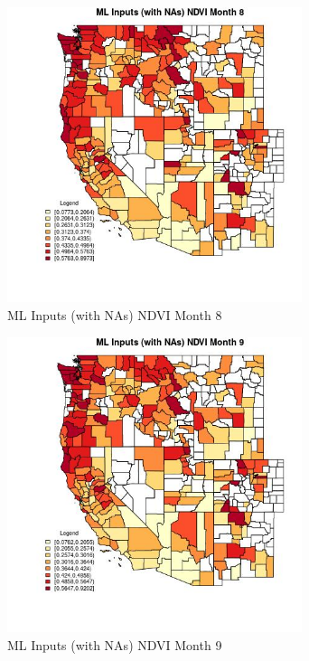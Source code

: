 \begin{figure} 
\centering  
\includegraphics[width=0.77\textwidth]{Code_Outputs/Report_ML_input_PM25_Step4_part_f_de_duplicated_aveswNAs_CountyNDVImedianMonth8.jpg} 
\caption{\label{fig:Report_ML_input_PM25_Step4_part_f_de_duplicated_aveswNAsCountyNDVImedianMonth8}ML Inputs (with NAs) NDVI Month 8} 
\end{figure} 
 

\begin{figure} 
\centering  
\includegraphics[width=0.77\textwidth]{Code_Outputs/Report_ML_input_PM25_Step4_part_f_de_duplicated_aveswNAs_CountyNDVImedianMonth9.jpg} 
\caption{\label{fig:Report_ML_input_PM25_Step4_part_f_de_duplicated_aveswNAsCountyNDVImedianMonth9}ML Inputs (with NAs) NDVI Month 9} 
\end{figure} 
 

